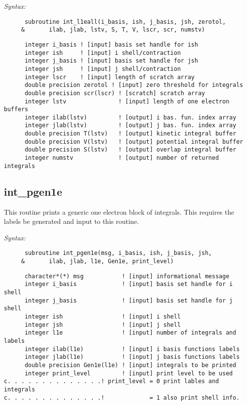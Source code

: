 {\it Syntax:} 
\begin{verbatim} 
      subroutine int_l1eall(i_basis, ish, j_basis, jsh, zerotol, 
     &       ilab, jlab, lstv, S, T, V, lscr, scr, numstv)  
\end{verbatim} 
\begin{verbatim} 
      integer i_basis ! [input] basis set handle for ish 
      integer ish     ! [input] i shell/contraction 
      integer j_basis ! [input] basis set handle for jsh 
      integer jsh     ! [input] j shell/contraction 
      integer lscr    ! [input] length of scratch array 
      double precision zerotol ! [input] zero threshold for integrals 
      double precision scr(lscr) ! [scratch] scratch array 
      integer lstv               ! [input] length of one electron buffers 
      integer ilab(lstv)         ! [output] i bas. fun. index array 
      integer jlab(lstv)         ! [output] j bas. fun. index array 
      double precision T(lstv)   ! [output] kinetic integral buffer 
      double precision V(lstv)   ! [output] potential integral buffer 
      double precision S(lstv)   ! [output] overlap integral buffer 
      integer numstv             ! [output] number of returned integrals 
\end{verbatim} 
\subsection{int\_pgen1e} 
This routine prints a generic one electron block of integrals. 
This requires the labels be generated and input to this routine. 
 
{\it Syntax:} 
\begin{verbatim} 
      subroutine int_pgen1e(msg, i_basis, ish, j_basis, jsh,  
     &       ilab, jlab, l1e, Gen1e, print_level) 
\end{verbatim} 
\begin{verbatim} 
      character*(*) msg           ! [input] informational message 
      integer i_basis             ! [input] basis set handle for i shell 
      integer j_basis             ! [input] basis set handle for j shell 
      integer ish                 ! [input] i shell 
      integer jsh                 ! [input] j shell  
      integer l1e                 ! [input] number of integrals and labels 
      integer ilab(l1e)           ! [input] i basis functions labels 
      integer jlab(l1e)           ! [input] j basis functions labels 
      double precision Gen1e(l1e) ! [input] integrals to be printed 
      integer print_level         ! [input] print level to be used 
c. . . . . . . . . . . . . .! print_level = 0 print lables and integrals 
c. . . . . . . . . . . . . .!             = 1 also print shell info. 
\end{verbatim} 
